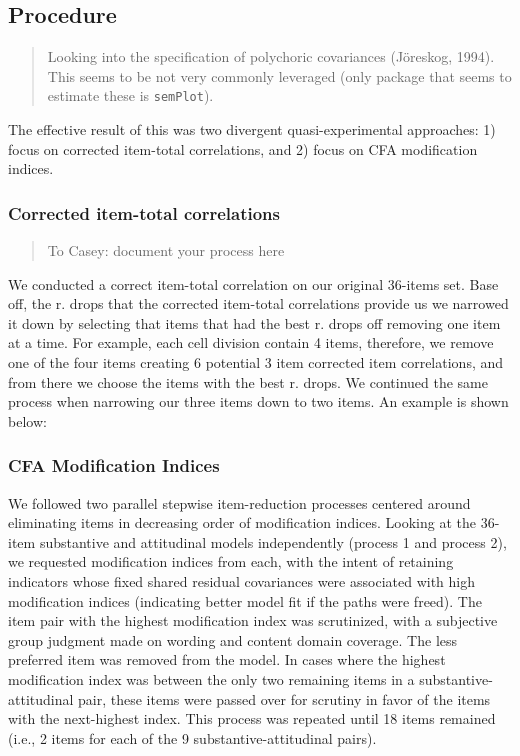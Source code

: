 \documentclass[
  english,
  man]{apa6}
\begin{document}
\hypertarget{procedure}{%
\subsection{Procedure}\label{procedure}}

\begin{quote}
Looking into the specification of polychoric covariances (Jöreskog, 1994). This seems to be not very commonly leveraged (only package that seems to estimate these is \texttt{semPlot}).
\end{quote}

The effective result of this was two divergent quasi-experimental approaches: 1) focus on corrected item-total correlations, and 2) focus on CFA modification indices.

\hypertarget{corrected-item-total-correlations}{%
\subsubsection{Corrected item-total correlations}\label{corrected-item-total-correlations}}

\begin{quote}
To Casey: document your process here
\end{quote}

We conducted a correct item-total correlation on our original 36-items set. Base off, the r. drops that the corrected item-total correlations provide us we narrowed it down by selecting that items that had the best r. drops off removing one item at a time. For example, each cell division contain 4 items, therefore, we remove one of the four items creating 6 potential 3 item corrected item correlations, and from there we choose the items with the best r. drops. We continued the same process when narrowing our three items down to two items. An example is shown below:

\hypertarget{cfa-modification-indices}{%
\subsubsection{CFA Modification Indices}\label{cfa-modification-indices}}

We followed two parallel stepwise item-reduction processes centered around eliminating items in decreasing order of modification indices. Looking at the 36-item substantive and attitudinal models independently (process 1 and process 2), we requested modification indices from each, with the intent of retaining indicators whose fixed shared residual covariances were associated with high modification indices (indicating better model fit if the paths were freed). The item pair with the highest modification index was scrutinized, with a subjective group judgment made on wording and content domain coverage. The less preferred item was removed from the model. In cases where the highest modification index was between the only two remaining items in a substantive-attitudinal pair, these items were passed over for scrutiny in favor of the items with the next-highest index. This process was repeated until 18 items remained (i.e., 2 items for each of the 9 substantive-attitudinal pairs).
\end{document}
